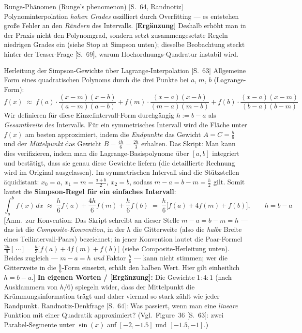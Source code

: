 \begin{defbox}{Runge-Phänomen (Runge's phenomenon) [S.~64, Randnotiz]}
Polynominterpolation \emph{hohen Grades} oszilliert durch Overfitting --- es entstehen
gro{\ss}e Fehler an den \emph{Rändern} des Intervalls. \textbf{[Ergänzung]} Deshalb
erhöht man in der Praxis nicht den Polynomgrad, sondern setzt zusammengesetzte Regeln
niedrigen Grades ein (siehe \glqq Stop at Simpson\grqq{} unten); dieselbe Beobachtung
steckt hinter der Teaser-Frage [S.~69], warum Hochordnungs-Quadratur instabil wird.
\end{defbox}

\begin{satzbox}{Herleitung der Simpson-Gewichte über Lagrange-Interpolation [S.~63]}
Allgemeine Form eines quadratischen Polynoms durch die drei Punkte bei $a$, $m$, $b$
(Lagrange-Form):
\[
  f(x) \;\approx\; f(a)\cdot\frac{(x-m)(x-b)}{(a-m)(a-b)}
        + f(m)\cdot\frac{(x-a)(x-b)}{(m-a)(m-b)}
        + f(b)\cdot\frac{(x-a)(x-m)}{(b-a)(b-m)}
\]
Wir definieren für diese Einzelintervall-Form durchgängig $h := b - a$ als
\emph{Gesamtbreite} des Intervalls. Für ein symmetrisches Intervall wird die Fläche
unter $f(x)$ am besten approximiert, indem die \emph{Endpunkte} das Gewicht
$A = C = \frac{h}{6}$ und der \emph{Mittelpunkt} das Gewicht
$B = \frac{4h}{6} = \frac{2h}{3}$ erhalten. Das Skript: Man kann dies verifizieren,
indem man die Lagrange-Basispolynome über $[a,b]$ integriert und bestätigt, dass sie
genau diese Gewichte liefern (die detaillierte Rechnung wird im Original ausgelassen).
Im symmetrischen Intervall sind die Stützstellen äquidistant: $x_0 = a$,
$x_1 = m = \frac{a+b}{2}$, $x_2 = b$, sodass $m - a = b - m = \frac{h}{2}$ gilt.
Somit lautet die \textbf{Simpson-Regel für ein einfaches Intervall}:
\[
  \int_a^b f(x)\,dx \;\approx\; \frac{h}{6}f(a) + \frac{4h}{6}f(m) + \frac{h}{6}f(b)
  \;=\; \frac{h}{6}\bigl[f(a) + 4f(m) + f(b)\bigr], \qquad h = b - a
\]
[Anm.\ zur Konvention: Das Skript schreibt an dieser Stelle \glqq$m - a = b - m =
h$\grqq{} --- das ist die \emph{Composite-Konvention}, in der $h$ die Gitterweite
(also die \emph{halbe} Breite eines Teilintervall-Paars) bezeichnet; in jener
Konvention lautet die Paar-Formel $\frac{2h}{6}[\,\cdots] = \frac{h}{3}\bigl[f(a) +
4f(m) + f(b)\bigr]$ (siehe Composite-Herleitung unten). Beides zugleich --- $m-a=h$
\emph{und} Faktor $\frac{h}{6}$ --- kann nicht stimmen; wer die Gitterweite in die
$\frac{h}{6}$-Form einsetzt, erhält den halben Wert. Hier gilt einheitlich
$h = b - a$.]
\textbf{In eigenen Worten / [Ergänzung]:} Die Gewichte $1:4:1$ (nach
Ausklammern von $h/6$) spiegeln wider, dass der Mittelpunkt die Krümmungsinformation
trägt und daher viermal so stark zählt wie jeder Randpunkt. Randnotiz-Denkfrage
[S.~64]: Was passiert, wenn man eine \emph{lineare} Funktion mit einer Quadratik
approximiert? (Vgl.\ Figure~36 [S.~63]: zwei Parabel-Segmente unter $\sin(x)$ auf
$[-2,-1.5]$ und $[-1.5,-1]$.)
\end{satzbox}

